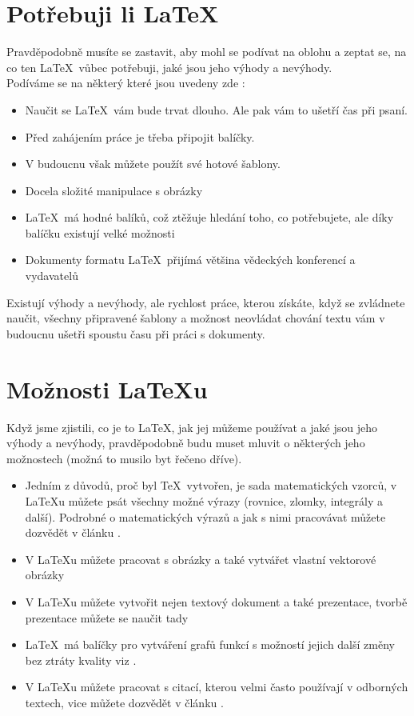 \documentclass[a4paper,11pt]{article}
\begin{document}
\section{Potřebuji li \LaTeX}
Pravděpodobně musíte se zastavit, aby mohl se podívat na oblohu a zeptat se, na co ten \LaTeX ~vůbec potřebuji,  jaké jsou jeho výhody a nevýhody.\\
Podíváme se na některý které jsou uvedeny zde \cite{VanDongenM.R.C.2012LaF}:
\begin{itemize}
\item Naučit se \LaTeX ~vám bude trvat dlouho. Ale pak vám to ušetří čas při psaní.
\item Před zahájením práce je třeba připojit balíčky.
\item V budoucnu však můžete použít své hotové šablony.
\item Docela složité manipulace s obrázky
\item \LaTeX ~má hodné balíků, což ztěžuje hledání toho, co potřebujete, ale díky balíčku existují velké možnosti
\item Dokumenty formatu \LaTeX ~přijímá většina vědeckých konferencí a vydavatelů
\end{itemize}


Existují výhody a nevýhody, ale rychlost práce, kterou získáte, když se zvládnete naučit, všechny připravené šablony a možnost neovládat chování textu vám v budoucnu ušetři spoustu času při práci s dokumenty.

\section{Možnosti \LaTeX u}
Když jsme zjistili, co je to \LaTeX, jak jej můžeme používat a jaké jsou jeho výhody a nevýhody, pravděpodobně budu muset mluvit o některých jeho možnostech (možná to musilo byt řečeno dříve).
\begin{itemize}
\item Jedním z důvodů, proč byl \TeX ~vytvořen, je sada matematických vzorců, v \LaTeX u můžete psát všechny možné výrazy (rovnice, zlomky, integrály a další). Podrobné o matematických výrazů a jak s nimi pracovávat můžete dozvědět v článku \cite{Vojtech}.

\item V \LaTeX u můžete pracovat s obrázky a také vytvářet vlastní vektorové obrázky 

\item V \LaTeX u můžete vytvořit nejen textový dokument a také prezentace, tvorbě prezentace můžete se naučit tady \cite{Zelenka}

\item \LaTeX ~má balíčky pro vytváření grafů funkcí s možností jejich další změny bez ztráty kvality viz \cite{Polasek}.

\item V \LaTeX u můžete pracovat s citací, kterou velmi často používají v odborných textech, vice můžete dozvědět v článku \cite{DMartinek}.
\end{itemize}
\end{document}
